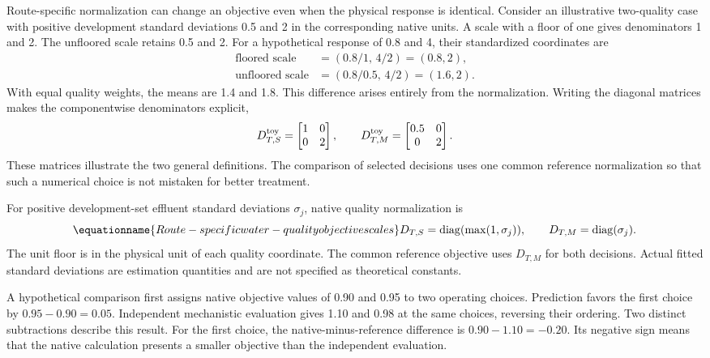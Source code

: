 Route-specific normalization can change an objective even when the physical response is identical. Consider an illustrative two-quality case with positive development standard deviations 0.5 and 2 in the corresponding native units. A scale with a floor of one gives denominators 1 and 2. The unfloored scale retains 0.5 and 2. For a hypothetical response of 0.8 and 4, their standardized coordinates are
\[
\begin{aligned}
\text{floored scale}&=(0.8/1,\,4/2)=(0.8,2),\\
\text{unfloored scale}&=(0.8/0.5,\,4/2)=(1.6,2).
\end{aligned}
\]
With equal quality weights, the means are 1.4 and 1.8. This difference arises entirely from the normalization. Writing the diagonal matrices makes the componentwise denominators explicit,
\[
D_{T,S}^{\rm toy}=\begin{bmatrix}1&0\\0&2\end{bmatrix},\qquad
D_{T,M}^{\rm toy}=\begin{bmatrix}0.5&0\\0&2\end{bmatrix}.
\]
These matrices illustrate the two general definitions. The comparison of selected decisions uses one common reference normalization so that such a numerical choice is not mistaken for better treatment.

For positive development-set effluent standard deviations $\sigma_j$, native quality normalization is
\begin{equation}
\equationname{Route-specific water-quality objective scales}
D_{T,S}=\operatorname{diag}(\max(1,\sigma_j)),\qquad
D_{T,M}=\operatorname{diag}(\sigma_j).
\label{eq:plant_route_normalization}
\end{equation}
The unit floor is in the physical unit of each quality coordinate. The common reference objective uses $D_{T,M}$ for both decisions. Actual fitted standard deviations are estimation quantities and are not specified as theoretical constants.

A hypothetical comparison first assigns native objective values of 0.90 and 0.95 to two operating choices. Prediction favors the first choice by $0.95-0.90=0.05$. Independent mechanistic evaluation gives 1.10 and 0.98 at the same choices, reversing their ordering. Two distinct subtractions describe this result. For the first choice, the native-minus-reference difference is $0.90-1.10=-0.20$. Its negative sign means that the native calculation presents a smaller objective than the independent evaluation.

